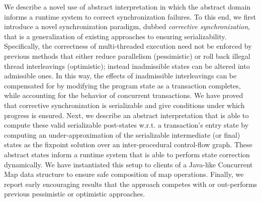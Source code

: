 We describe a novel use of abstract interpretation in which the
abstract domain informs a runtime system to correct synchronization
failures. To this end, we first introduce a novel synchronization paradigm,
dubbed \emph{corrective synchronization},
that is a generalization of existing approaches to ensuring serializability.
%
Specifically, the correctness of multi-threaded execution need not be
enforced by previous methods that either reduce parallelism
(pessimistic) or roll back illegal thread interleavings (optimistic);
instead inadmissible states can be altered into admissible ones.
%
In this way, the effects of inadmissible interleavings can be
compensated for by modifying the program state as a transaction
completes, while accounting for the behavior of concurrent
transactions.
%
We have proved that corrective
synchronization is serializable and give conditions under which
progress is ensured. Next, we describe an abstract
interpretation that is able to compute these valid serializable
post-states w.r.t. a transaction's entry state by computing
an under-approximation of the serializable intermediate (or final) states
as the fixpoint solution over an inter-procedural control-flow graph.
%
These abstract states
inform a runtime system that is able to perform state correction
dynamically. We have instantiated this setup to clients of a Java-like
Concurrent Map data structure to ensure safe composition of map
operations. Finally, we report early encouraging results that the
approach competes with or out-performs previous pessimistic or
optimistic approaches.
